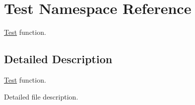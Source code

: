 \hypertarget{namespace_test}{}\section{Test Namespace Reference}
\label{namespace_test}


\hyperlink{namespace_test}{Test} function.  




\subsection{Detailed Description}
\hyperlink{namespace_test}{Test} function. 

Detailed file description. 
